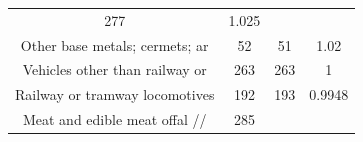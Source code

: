 \documentclass[10pt,]{article}
\begin{document}
\begin{longtable}[]{@{}cccc@{}}
\begin{minipage}[t]{0.20\columnwidth}
277\strut
\end{minipage} & \begin{minipage}[t]{0.09\columnwidth}\centering\strut
1.025\strut
\end{minipage}\tabularnewline
\begin{minipage}[t]{0.38\columnwidth}\centering\strut
Other base metals; cermets; ar\strut
\end{minipage} & \begin{minipage}[t]{0.21\columnwidth}\centering\strut
52\strut
\end{minipage} & \begin{minipage}[t]{0.20\columnwidth}\centering\strut
51\strut
\end{minipage} & \begin{minipage}[t]{0.09\columnwidth}\centering\strut
1.02\strut
\end{minipage}\tabularnewline
\begin{minipage}[t]{0.38\columnwidth}\centering\strut
Vehicles other than railway or\strut
\end{minipage} & \begin{minipage}[t]{0.21\columnwidth}\centering\strut
263\strut
\end{minipage} & \begin{minipage}[t]{0.20\columnwidth}\centering\strut
263\strut
\end{minipage} & \begin{minipage}[t]{0.09\columnwidth}\centering\strut
1\strut
\end{minipage}\tabularnewline
\begin{minipage}[t]{0.38\columnwidth}\centering\strut
Railway or tramway locomotives\strut
\end{minipage} & \begin{minipage}[t]{0.21\columnwidth}\centering\strut
192\strut
\end{minipage} & \begin{minipage}[t]{0.20\columnwidth}\centering\strut
193\strut
\end{minipage} & \begin{minipage}[t]{0.09\columnwidth}\centering\strut
0.9948\strut
\end{minipage}\tabularnewline
\begin{minipage}[t]{0.38\columnwidth}\centering\strut
Meat and edible meat offal //\strut
\end{minipage} & \begin{minipage}[t]{0.21\columnwidth}\centering\strut
285\strut
\end{minipage} & \begin{minipage}[t]{0.20\columnwidth}\centering\strut

\end{minipage}
\end{longtable}
\end{document}

